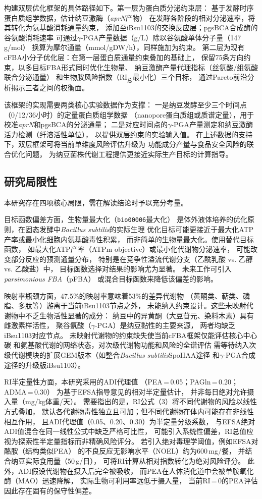 \documentclass[10pt, a4paper, twocolumn]{ctexart}
\newcommand{\ibsu}{iBsu1103}
\newcommand{\bs}{\textit{Bacillus subtilis}}
\begin{document}
构建双层优化框架的具体路径如下。第一层为蛋白质分泌约束层：
基于发酵时序蛋白质组学数据，估计纳豆激酶（\textit{aprN}产物）
在发酵各阶段的相对分泌速率，将其转化为氨基酸消耗通量约束，
添加至\ibsu{}的交换反应层；pgsBCA合成酶的谷氨酸消耗速率
可通过$\gamma$-PGA产量数据（g/L）除以谷氨酸单体分子量（147 g/mol）
换算为摩尔通量（mmol/gDW/h），同样施加为约束。
第二层为现有cFBA小分子优化层：在第一层蛋白质通量约束叠加的基础上，
保留75条方向约束，以多目标FBA形式同时优化生物量、
纳豆激酶产量代理指标（丝氨酸/组氨酸联合分泌通量）
和生物胺风险指数（RI$_\text{总}$最小化）三个目标，
通过Pareto前沿分析揭示三者之间的权衡面。

该框架的实现需要两类核心实验数据作为支撑：
一是纳豆发酵至少三个时间点（0/12/36小时）的定量蛋白质组学数据
（nanopore蛋白质组或质谱定量），用于校准\textit{aprN}和pgsBCA的分泌通量；
二是对应时间点的$\gamma$-PGA产量测定和纳豆激酶活力检测（纤溶活性单位），
以提供双层约束的实验输入值。
在上述数据的支持下，双层框架可将当前单维度风险评估升级为
功能成分产量与食品安全风险的联合优化问题，
为纳豆菌株代谢工程提供更接近实际生产目标的计算指导。

\subsection{研究局限性}

本研究存在四项核心局限，需在解读结论时予以充分考量。

目标函数偏差方面，生物量最大化（\texttt{bio00006}最大化）
是体外液体培养的优化原则，在固态发酵中\bs{}的实际生理
优化目标可能更接近于最大化ATP产率或最小化细胞内氨基酸毒性积累，
而非简单的生物量最大化。使用替代目标函数，
如最大化ATP产率（ATPm objective）或最小化代谢物分泌速率，
可能改变部分反应的预测通量分布，
特别是在竞争性溢流代谢分支（乙酰乳酸 vs. 乙醇 vs. 乙酸盐）中，
目标函数选择对结果的影响尤为显著。
未来工作可引入\textit{parsimonious FBA}（pFBA）
或混合目标函数来降低该偏差的影响。

映射率瓶颈方面，47.5\%的映射率意味着53\%的差异代谢物
（黄酮类、萜类、磷脂、多肽等）游离于当前\ibsu{}节点之外，
未能纳入约束设计。这些未映射代谢物中不乏生物活性显著的成分：
纳豆中的异黄酮（大豆苷元、染料木素）具有雌激素样活性，
聚谷氨酸（$\gamma$-PGA）是纳豆黏性的主要来源，
两者均缺乏\ibsu{}对应节点。
未映射代谢物的约束缺失使当前cFBA框架仅能评估核心中心碳
和氨基酸代谢的网络状态，对次级代谢物功能和风险的全谱评估
需等待纳入次级代谢模块的扩展GEM版本（如整合\bs{}SpoIIAA途径
和$\gamma$-PGA合成途径的升级版\ibsu{}）。

RI半定量性方面，本研究采用的ADI代理值
（PEA\,=\,0.05；PAGln\,=\,0.20；ADMA\,=\,0.30）
为基于EFSA指导意见的相对半定量估计，
并非每日绝对允许摄入量（mg/kg体重/天）。
需要指出的是，RI公式（3）将不同代谢物的风险以线性方式叠加，
默认各代谢物毒性独立且可加；但不同代谢物在体内可能存在非线性相互作用，
且ADI代理值（0.05、0.20、0.30）为半定量分级系数，
与EFSA绝对ADI值混合在同一线性公式中缺乏严格可比性，
可能引入系统性偏差，RI总值应视为探索性半定量指标而非精确风险评分。
若引入绝对毒理学阈值，例如EFSA对酪胺（结构类似PEA）
的不良反应无影响水平（NOEL）约为600\,mg/餐，
并结合纳豆实际食用量（50\,g/日），
可将RI计算从相对指数转化为绝对风险评分。
此外，ADI假设代谢物在摄入后完全被吸收，
而PEA在人体消化道中会被单胺氧化酶（MAO）迅速降解，
实际生物可利用率远低于摄入量，
当前RI\,=\,0的PEA评估因此存在固有的保守性偏差。
\end{document}
